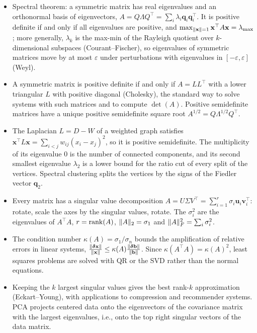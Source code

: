 \begin{itemize}[leftmargin=*]
    \item Spectral theorem: a symmetric matrix has real eigenvalues and an orthonormal basis of eigenvectors, $A = Q\Lambda Q^\top = \sum_i \lambda_i \mathbf{q}_i \mathbf{q}_i^\top$. It is positive definite if and only if all eigenvalues are positive, and $\max_{\lVert \mathbf{x} \rVert = 1} \mathbf{x}^\top A \mathbf{x} = \lambda_{\max}$; more generally, $\lambda_k$ is the max-min of the Rayleigh quotient over $k$-dimensional subspaces (Courant--Fischer), so eigenvalues of symmetric matrices move by at most $\varepsilon$ under perturbations with eigenvalues in $[-\varepsilon, \varepsilon]$ (Weyl).
    \item A symmetric matrix is positive definite if and only if $A = LL^\top$ with a lower triangular $L$ with positive diagonal (Cholesky), the standard way to solve systems with such matrices and to compute $\det(A)$. Positive semidefinite matrices have a unique positive semidefinite square root $A^{1/2} = Q\Lambda^{1/2}Q^\top$.
    \item The Laplacian $L = D - W$ of a weighted graph satisfies $\mathbf{x}^\top L\mathbf{x} = \sum_{i < j} w_{ij}(x_i - x_j)^2$, so it is positive semidefinite. The multiplicity of its eigenvalue $0$ is the number of connected components, and its second smallest eigenvalue $\lambda_2$ is a lower bound for the ratio cut of every split of the vertices. Spectral clustering splits the vertices by the signs of the Fiedler vector $\mathbf{q}_2$.
    \item Every matrix has a singular value decomposition $A = U\Sigma V^\top = \sum_{i=1}^r \sigma_i \mathbf{u}_i \mathbf{v}_i^\top$: rotate, scale the axes by the singular values, rotate. The $\sigma_i^2$ are the eigenvalues of $A^\top A$, $r = \operatorname{rank}(A)$, $\lVert A \rVert_2 = \sigma_1$ and $\lVert A \rVert_F^2 = \sum_i \sigma_i^2$.
    \item The condition number $\kappa(A) = \sigma_1/\sigma_n$ bounds the amplification of relative errors in linear systems, $\frac{\lVert \boldsymbol{\delta}\mathbf{x} \rVert}{\lVert \mathbf{x} \rVert} \leq \kappa(A)\frac{\lVert \boldsymbol{\delta}\mathbf{b} \rVert}{\lVert \mathbf{b} \rVert}$. Since $\kappa(A^\top A) = \kappa(A)^2$, least squares problems are solved with QR or the SVD rather than the normal equations.
    \item Keeping the $k$ largest singular values gives the best rank-$k$ approximation (Eckart--Young), with applications to compression and recommender systems. PCA projects centered data onto the eigenvectors of the covariance matrix with the largest eigenvalues, i.e., onto the top right singular vectors of the data matrix.
\end{itemize}

